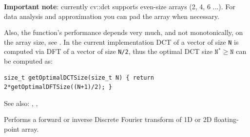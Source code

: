 \textbf{Important note}: currently cv::dct supports even-size arrays (2, 4, 6 ...). For data analysis and approximation you can pad the array when necessary.

Also, the function's performance depends very much, and not monotonically, on the array size, see . In the current implementation DCT of a vector of size \texttt{N} is computed via DFT of a vector of size \texttt{N/2}, thus the optimal DCT size $\texttt{N}^*\geq\texttt{N}$ can be computed as:

\begin{lstlisting}
size_t getOptimalDCTSize(size_t N) { return 2*getOptimalDFTSize((N+1)/2); }
\end{lstlisting}

See also: , , 


\label{dft}
Performs a forward or inverse Discrete Fourier transform of 1D or 2D floating-point array.

